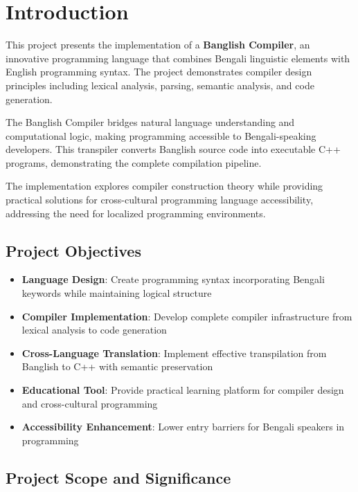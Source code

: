 \documentclass[12pt,a4paper]{article}
\begin{document}
\tableofcontents
\thispagestyle{fancy}
\newpage

\section{Introduction}

This project presents the implementation of a \textbf{Banglish Compiler}, an innovative programming language that combines Bengali linguistic elements with English programming syntax. The project demonstrates compiler design principles including lexical analysis, parsing, semantic analysis, and code generation.

The Banglish Compiler bridges natural language understanding and computational logic, making programming accessible to Bengali-speaking developers. This transpiler converts Banglish source code into executable C++ programs, demonstrating the complete compilation pipeline.

The implementation explores compiler construction theory while providing practical solutions for cross-cultural programming language accessibility, addressing the need for localized programming environments.

\subsection{Project Objectives}

\begin{itemize}[leftmargin=*,itemsep=3pt]
    \item \textbf{Language Design}: Create programming syntax incorporating Bengali keywords while maintaining logical structure
    \item \textbf{Compiler Implementation}: Develop complete compiler infrastructure from lexical analysis to code generation
    \item \textbf{Cross-Language Translation}: Implement effective transpilation from Banglish to C++ with semantic preservation
    \item \textbf{Educational Tool}: Provide practical learning platform for compiler design and cross-cultural programming
    \item \textbf{Accessibility Enhancement}: Lower entry barriers for Bengali speakers in programming
\end{itemize}

\subsection{Project Scope and Significance}
\end{document}
